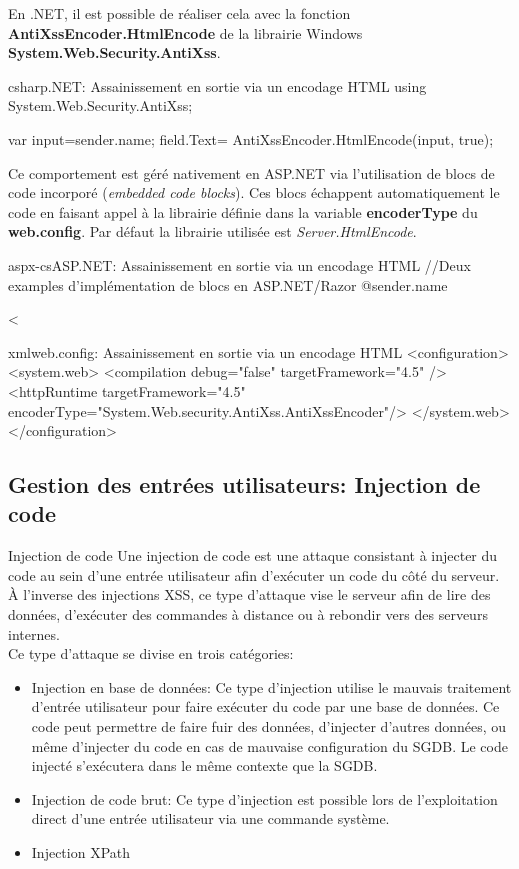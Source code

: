 \documentclass[twoside,a4paper,12pt,titlepage]{book}
\begin{document}
En .NET, il est possible de réaliser cela avec la fonction \textbf{AntiXssEncoder.HtmlEncode} de la librairie Windows \textbf{System.Web.Security.AntiXss}.
\begin{Config}{csharp}{.NET: Assainissement en sortie via un encodage HTML}
using System.Web.Security.AntiXss;

	var input=sender.name;
	field.Text= AntiXssEncoder.HtmlEncode(input, true);

\end{Config}	

Ce comportement est géré nativement en ASP.NET via l'utilisation de blocs de code incorporé (\textit{embedded code blocks}). Ces blocs échappent automatiquement le code en faisant appel à la librairie définie dans la variable \textbf{encoderType} du \textbf{web.config}. Par défaut la librairie utilisée est \textit{Server.HtmlEncode}.\\
\begin{Config}{aspx-cs}{ASP.NET: Assainissement en sortie via un encodage HTML}
	//Deux examples d'implémentation de blocs en ASP.NET/Razor
	@sender.name
	
	<%
\end{Config}
\begin{Config}{xml}{web.config: Assainissement en sortie via un encodage HTML}
<configuration>
	<system.web>
		<compilation debug="false" targetFramework="4.5" />
		<httpRuntime targetFramework="4.5" 
			encoderType="System.Web.security.AntiXss.AntiXssEncoder"/>
	</system.web>
</configuration>
\end{Config}

\subsection{Gestion des entrées utilisateurs: Injection de code}
\begin{Define}{Injection de code}
Une injection de code est une attaque consistant à injecter du code au sein d'une entrée utilisateur afin d'exécuter un code du côté du serveur. \`A l'inverse des injections XSS, ce type d'attaque vise le serveur afin de lire des données, d'exécuter des commandes à distance ou à rebondir vers des serveurs internes.\\
Ce type d'attaque se divise en trois catégories:\begin{itemize}
\item Injection en base de données: Ce type d'injection utilise le mauvais traitement d'entrée utilisateur pour faire exécuter du code par une base de données. Ce code peut permettre de faire fuir des données, d'injecter d'autres données, ou même d'injecter du code en cas de mauvaise configuration du \gls{SGDB}. Le code injecté s'exécutera dans le même contexte que la \gls{SGDB}.
\item Injection de code brut: Ce type d'injection est possible lors de l'exploitation direct d'une entrée utilisateur via une commande système.
\item Injection XPath
\end{itemize}
\end{Define}
\end{document}
